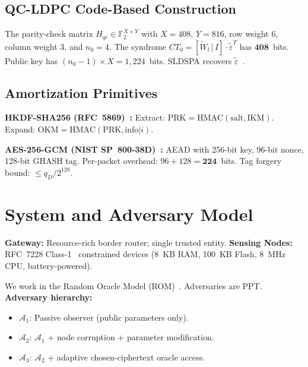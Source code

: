 \documentclass[runningheads]{llncs}
\begin{document}
\subsection{QC-LDPC Code-Based Construction}

The parity-check matrix $H_{qc} \in \mathbb{F}_2^{X \times Y}$ with $X = 408$,
$Y = 816$, row weight 6, column weight 3, and $n_0 = 4$. The syndrome
$CT_0 = [\tilde{W}_l\,|\,I] \cdot \tilde{\varepsilon}^T$ has $\mathbf{408}$~bits.
Public key has $(n_0-1) \times X = 1{,}224$~bits. SLDSPA recovers
$\tilde{\varepsilon}$~\cite{gallager1962,baldi2016}.

\subsection{Amortization Primitives}

\textbf{HKDF-SHA256 (RFC~5869)~\cite{rfc5869}:} Extract:
$\mathrm{PRK} = \mathrm{HMAC}(\mathrm{salt, IKM})$.
Expand: $\mathrm{OKM} = \mathrm{HMAC}(\mathrm{PRK, info}|i)$.

\textbf{AES-256-GCM (NIST SP~800-38D)~\cite{nist38d}:} AEAD with 256-bit key,
96-bit nonce, 128-bit GHASH tag. Per-packet overhead: $96+128 = \mathbf{224}$~bits.
Tag forgery bound: $\leq q_D/2^{128}$.

\section{System and Adversary Model}
\label{sec:model}

\textbf{Gateway:} Resource-rich border router; single trusted entity.
\textbf{Sensing Nodes:} RFC~7228 Class-1~\cite{rfc7228} constrained devices
(8~KB RAM, 100~KB Flash, 8~MHz CPU, battery-powered).

We work in the Random Oracle Model (ROM)~\cite{kumari2022}. Adversaries are
PPT. \textbf{Adversary hierarchy:}
\begin{itemize}
  \item $\mathcal{A}_1$: Passive observer (public parameters only).
  \item $\mathcal{A}_2$: $\mathcal{A}_1$ + node corruption + parameter modification.
  \item $\mathcal{A}_3$: $\mathcal{A}_2$ + adaptive chosen-ciphertext oracle access.
\end{itemize}
\end{document}
